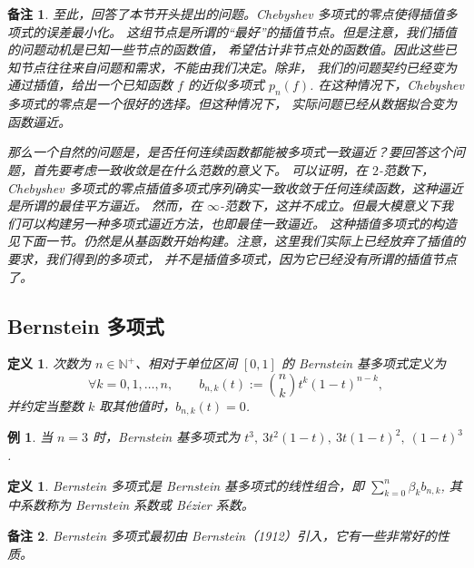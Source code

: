 \documentclass[a4paper]{ctexart}
\newtheorem*{remark*}{备注}
\newtheorem{definition}[theorem]{定义} %
\newtheorem{example}[theorem]{例}
\numberwithin{theorem}{section}
\numberwithin{equation}{section}
\numberwithin{figure}{section}
\numberwithin{remark}{section}
\begin{document}
\begin{remark*}
    至此，回答了本节开头提出的问题。Chebyshev 多项式的零点使得插值多项式的误差最小化。
这组节点是所谓的“最好”的插值节点。但是注意，我们插值的问题动机是已知一些节点的函数值，
希望估计非节点处的函数值。因此这些已知节点往往来自问题和需求，不能由我们决定。除非，
我们的问题契约已经变为通过插值，给出一个已知函数 $f$ 的近似多项式 $p_n(f)$.
在这种情况下，Chebyshev 多项式的零点是一个很好的选择。但这种情况下，
实际问题已经从数据拟合变为函数逼近。

那么一个自然的问题是，是否任何连续函数都能被多项式一致逼近？要回答这个问题，首先要考虑一致收敛是在什么范数的意义下。
可以证明，在 $2$-范数下，Chebyshev 多项式的零点插值多项式序列确实一致收敛于任何连续函数，这种逼近是所谓的最佳平方逼近。
然而，在 $\infty$-范数下，这并不成立。但最大模意义下我们可以构建另一种多项式逼近方法，也即最佳一致逼近。
这种插值多项式的构造见下面一节。仍然是从基函数开始构建。注意，这里我们实际上已经放弃了插值的要求，我们得到的多项式，
并不是插值多项式，因为它已经没有所谓的插值节点了。
\end{remark*}

\subsection{Bernstein 多项式}

\begin{definition}
    \label{def::bernstein_basis}
次数为 $n\in\mathbb{N}^+$、相对于单位区间 $[0,1]$ 的 Bernstein 基多项式定义为
\begin{equation}
    \label{eq::bernstein_basis_def}
\forall k=0,1,\ldots,n,\qquad
b_{n,k}(t):=\binom{n}{k} t^{k}(1-t)^{n-k},
\end{equation}
并约定当整数 $k$ 取其他值时，$b_{n,k}(t)=0$.
\end{definition}

\begin{example}
当 $n=3$ 时，Bernstein 基多项式为
$t^{3},\ 3t^{2}(1-t),\ 3t(1-t)^{2},\ (1-t)^{3}$.
\end{example}

\begin{definition}
Bernstein 多项式是 Bernstein 基多项式的线性组合，即 $\sum_{k=0}^{n}\beta_{k} b_{n,k}$,
其中系数称为 Bernstein 系数或 Bézier 系数。
\end{definition}

\begin{remark*}
Bernstein 多项式最初由 Bernstein（1912）引入，它有一些非常好的性质。
\end{remark*}
\end{document}
